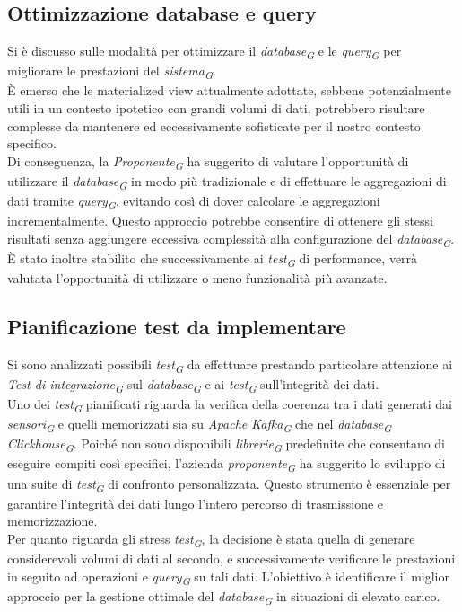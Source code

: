 \documentclass{article}
\begin{document}
    \subsection{Ottimizzazione database e query}
    Si è discusso sulle modalità per ottimizzare il \textit{database}\textsubscript{\textit{G}} e le \textit{query}\textsubscript{\textit{G}} per migliorare le prestazioni del \textit{sistema}\textsubscript{\textit{G}}. \\
    È emerso che le materialized view attualmente adottate, sebbene potenzialmente utili in un contesto ipotetico con grandi volumi di dati, potrebbero risultare complesse da mantenere ed eccessivamente sofisticate per il nostro contesto specifico. \\
    Di conseguenza, la \textit{Proponente}\textsubscript{\textit{G}} ha suggerito di valutare l'opportunità di utilizzare il \textit{database}\textsubscript{\textit{G}} in modo più tradizionale e di effettuare le aggregazioni di dati tramite \textit{query}\textsubscript{\textit{G}}, evitando così di dover calcolare le aggregazioni incrementalmente. Questo approccio potrebbe consentire di ottenere gli stessi risultati senza aggiungere eccessiva complessità alla configurazione del \textit{database}\textsubscript{\textit{G}}. È stato inoltre stabilito che successivamente ai \textit{test}\textsubscript{\textit{G}} di performance, verrà valutata l’opportunità di utilizzare o meno
    funzionalità più avanzate.
    \subsection{Pianificazione test da implementare}
    Si sono analizzati possibili \textit{test}\textsubscript{\textit{G}} da effettuare prestando particolare attenzione ai \textit{Test di integrazione}\textsubscript{\textit{G}} sul \textit{database}\textsubscript{\textit{G}} e ai \textit{test}\textsubscript{\textit{G}} sull'integrità dei dati. \\
    Uno dei \textit{test}\textsubscript{\textit{G}} pianificati riguarda la verifica della coerenza tra i dati generati dai \textit{sensori}\textsubscript{\textit{G}} e quelli memorizzati sia su \textit{Apache Kafka}\textsubscript{\textit{G}} che nel \textit{database}\textsubscript{\textit{G}} \textit{Clickhouse}\textsubscript{\textit{G}}. Poiché non sono disponibili \textit{librerie}\textsubscript{\textit{G}} predefinite che consentano di eseguire compiti così specifici, l'azienda \textit{proponente}\textsubscript{\textit{G}} ha suggerito lo sviluppo di una suite di \textit{test}\textsubscript{\textit{G}} di confronto personalizzata. Questo strumento è essenziale per garantire l'integrità dei dati lungo l'intero percorso di trasmissione e memorizzazione.\\
    Per quanto riguarda gli stress \textit{test}\textsubscript{\textit{G}}, la decisione è stata quella di generare considerevoli volumi di dati al secondo, e successivamente verificare le prestazioni in seguito ad operazioni e \textit{query}\textsubscript{\textit{G}} su tali dati. L'obiettivo è identificare il miglior approccio per la gestione ottimale del \textit{database}\textsubscript{\textit{G}} in situazioni di elevato carico. 
\end{document}
